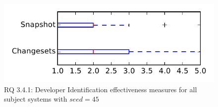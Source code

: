 
\begin{figure}
\centering
\includegraphics[height=0.4\textheight]{figures/dit_seed/rq1_tiny_45}
\caption{RQ 3.4.1: Developer Identification effectiveness measures for all subject systems with $seed=45$}
\label{fig:dit_seed:rq1:tiny}
\end{figure}
